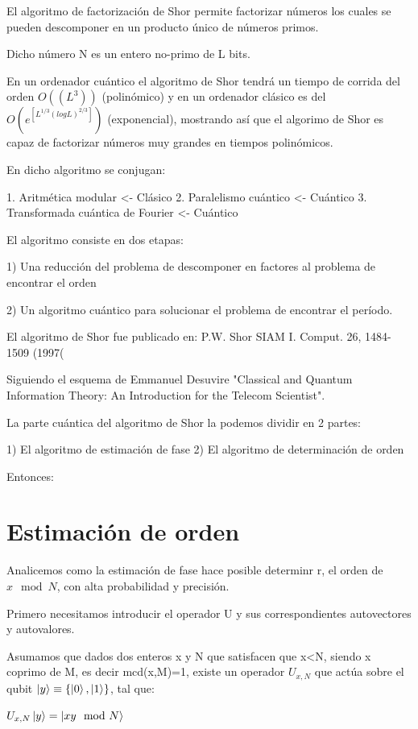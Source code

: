 El algoritmo de factorización de Shor permite factorizar números los cuales se pueden descomponer en un producto único de números primos.

Dicho número N es un entero no-primo de L bits.

En un ordenador cuántico el algoritmo de Shor tendrá un tiempo de corrida del orden $O((L^3))$ (polinómico) y en un ordenador clásico es del $O(e^[L^{1/3} (log L)^{2/3}])$ (exponencial), mostrando así que el algorimo de Shor es capaz de factorizar números muy grandes en tiempos polinómicos.

En dicho algoritmo se conjugan:

1. Aritmética modular <- Clásico
2. Paralelismo cuántico <- Cuántico
3. Transformada cuántica de Fourier <- Cuántico

El algoritmo consiste en dos etapas:

1) Una reducción del problema de descomponer en factores al problema de encontrar el orden

2) Un algoritmo cuántico para solucionar el problema de encontrar el período.

El algoritmo de Shor fue publicado en: P.W. Shor SIAM I. Comput. 26, 1484-1509 (1997(

Siguiendo el esquema de Emmanuel Desuvire "Classical and Quantum Information Theory: An Introduction for the Telecom Scientist".

La parte cuántica del algoritmo de Shor la podemos dividir en 2 partes:

1) El algoritmo de estimación de fase
2) El algoritmo de determinación de orden

Entonces:

\section{Estimación de orden}

Analicemos como la estimación de fase hace posible determinr r, el orden de $x \mod N$, con alta probabilidad y precisión.

Primero necesitamos introducir el operador U y sus correspondientes autovectores y autovalores.

Asumamos que dados dos enteros x y N que satisfacen que x<N, siendo x coprimo de M, es decir mcd(x,M)=1, existe un operador $U_{x,N}$ que actúa sobre el qubit $\ket{y} \equiv \{\ket{0}, \ket{1}\}$, tal que:

$U_{x,N} \ket{y} = \ket{x y \mod N}$

